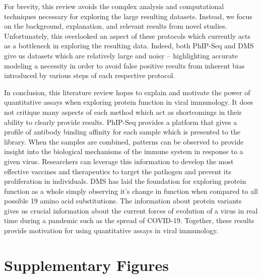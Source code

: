 \documentclass{article}
\begin{document}
For brevity, this review avoids the complex analysis and computational techniques necessary for exploring the large resulting datasets.
Instead, we focus on the background, explanation, and relevant results from novel studies.
Unfortunately, this overlooked an aspect of these protocols which currently acts as a bottleneck in exploring the resulting data.
Indeed, both PhIP-Seq and DMS give us datasets which are relatively large and noisy -- highlighting accurate modeling a necessity in order to avoid false positive results from inherent bias introduced by various steps of each respective protocol.

In conclusion, this literature review hopes to explain and motivate the power of quantitative assays when exploring protein function in viral immunology.
It does not critique many aspects of each method which act as shortcomings in their ability to clearly provide results.
PhIP-Seq provides a platform that gives a profile of antibody binding affinity for each sample which is presented to the library.
When the samples are combined, patterns can be observed to provide insight into the biological mechanisms of the immune system in response to a given virus.
Researchers can leverage this information to develop the most effective vaccines and therapeutics to target the pathogen and prevent its proliferation in individuals.
DMS has laid the foundation for exploring protein function as a whole simply observing it's change in function when compared to all possible 19 amino acid substitutions.
The information about protein variants gives us crucial information about the current forces of evolution of a virus in real time during a pandemic such as the spread of COVID-19.
Together, these results provide motivation for using quantitative assays in viral immunology.





% 
% 




\section*{Supplementary Figures}
\end{document}
